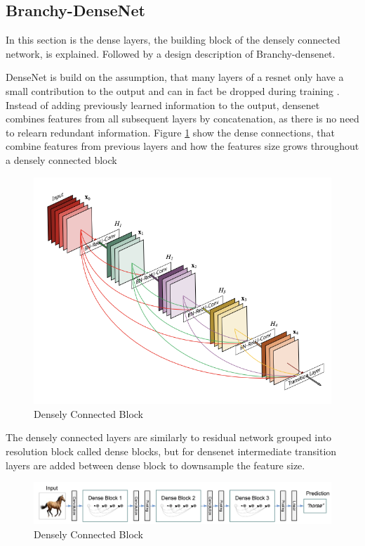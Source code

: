\subsection{Branchy-DenseNet}

In this section is the dense layers, the building block of the densely connected network, is explained. Followed by a design description of Branchy-\gls{densenet}.

DenseNet \cite{huang_densely_2016} is build on the assumption, that many layers of a \gls{resnet} only have a small contribution to the output and can in fact be dropped during training \cite{huang_densely_2016}. Instead of adding previously learned information to the output, \gls{densenet} combines features from all subsequent layers by concatenation, as there is no need to relearn redundant information. Figure \ref{fig:denseblock} show the dense connections, that combine features from previous layers and how the features size grows throughout a densely connected block 

\begin{figure}
	\centering
	\includegraphics[width=.5\linewidth]{figures/models/denseblock}
	\caption[Densely Connected Block]{Densely Connected Block}
	\label{fig:denseblock}
\end{figure}

The densely connected layers are similarly to residual network grouped into resolution block called dense blocks, but for \gls{densenet} intermediate transition layers are added between dense block to downsample the feature size. 

\begin{figure}
	\centering
	\includegraphics[width=\linewidth]{figures/models/densenet}
	\caption[Densely Connected Block]{Densely Connected Block}
	\label{fig:densenet}
\end{figure}

